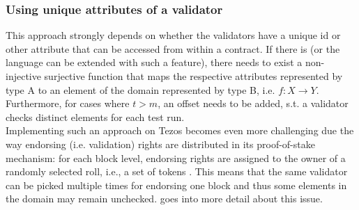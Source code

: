 \subsubsection{Using unique attributes of a validator}\label{sec:alt_attributes}
This approach strongly depends on whether the validators have a unique id or other attribute that can be accessed from within a contract.  If there is (or the language can be extended with such a feature), there needs to exist a non-injective surjective function that maps the respective attributes represented by type A to an element of the domain represented by type B, i.e. $f: X \rightarrow Y$. Furthermore, for cases where $t > m$, an offset needs to be added, s.t. a validator checks distinct elements for each test run. \\
Implementing such an approach on Tezos becomes even more challenging due the way endorsing (i.e. validation) rights are distributed in its proof-of-stake mechanism: for each block level, endorsing rights are assigned to the owner of a randomly selected roll, i.e., a set of tokens \cite{tezos_docs}. This means that the same validator can be picked multiple times for endorsing one block and thus some elements in the domain may remain unchecked. \secref{} goes into more detail about this issue. 